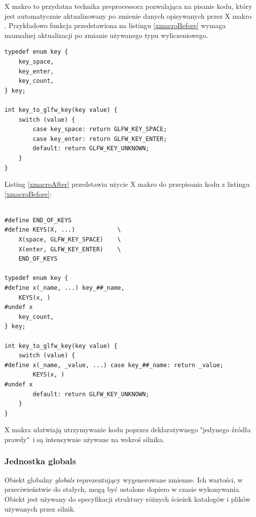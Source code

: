 X makro to przydatna technika preprocessora pozwalająca na pisanie kodu, który jest automatycznie aktualizowany po zmienie danych opisywanych przez X makro \cite{XMACRO}.
Przykładowo funkcja przedstawiona na listingu \ref{xmacroBefore} wymaga manualnej aktualizacji po zmianie używanego typu wyliczeniowego.
\lstset{language=C}
\begin{lstlisting}[caption={Przykładowy kod przed zastosowaniem X makro},captionpos=b,label={xmacroBefore}]
typedef enum key {
	key_space,
	key_enter,
	key_count,
} key;

int key_to_glfw_key(key value) {
	switch (value) {
		case key_space: return GLFW_KEY_SPACE;
		case key_enter: return GLFW_KEY_ENTER;
		default: return GLFW_KEY_UNKNOWN;
	}
}
\end{lstlisting}
Listing \ref{xmacroAfter} przedstawia użycie X makro do przepisania kodu z listingu \ref{xmacroBefore}:
\lstset{language=C}
\begin{lstlisting}[caption={Przykładowy kod po zastosowaniu X makro},captionpos=b,label={xmacroAfter}]

#define END_OF_KEYS
#define KEYS(X, ...)			\
	X(space, GLFW_KEY_SPACE)	\
	X(enter, GLFW_KEY_ENTER)	\
	END_OF_KEYS

typedef enum key {
#define x(_name, ...) key_##_name,
	KEYS(x, )
#undef x
	key_count,
} key;

int key_to_glfw_key(key value) {
	switch (value) {
#define x(_name, _value, ...) case key_##_name: return _value;
		KEYS(x, )
#undef x
		default: return GLFW_KEY_UNKNOWN;
	}
}
\end{lstlisting}
X makra ułatwiają utrzymywanie kodu poprzez deklaratywnego "jedynego źródła prawdy"\  i są intensywnie używane na wskroś silnika.

\subsubsection{Jednostka globals}
Obiekt globalny \textit{globals} reprezentujący wygenerowane zmienne.
Ich wartości, w przeciwieństwie do stałych, mogą być ustalone dopiero w czasie wykonywania.
Obiekt jest używany do specyfikacji struktury różnych ścieżek katalogów i plików używanych przez silnik.

